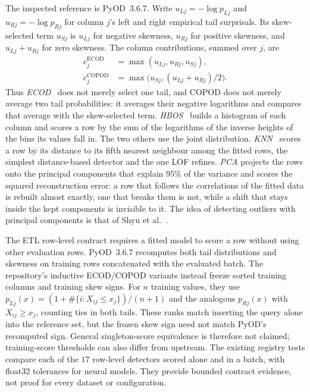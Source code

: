 \documentclass[conference]{IEEEtran}
\begin{document}
The inspected reference is PyOD~3.6.7. Write $u_{Lj}=-\log p_{Lj}$ and
$u_{Rj}=-\log p_{Rj}$ for column $j$'s left and right empirical tail
surprisals. Its skew-selected term $u_{Sj}$ is $u_{Lj}$ for negative
skewness, $u_{Rj}$ for positive skewness, and $u_{Lj}+u_{Rj}$ for zero
skewness. The column contributions, summed over $j$, are
\[
\begin{aligned}
c_j^{\mathrm{ECOD}}&=\max(u_{Lj},u_{Rj},u_{Sj}),\\
c_j^{\mathrm{COPOD}}&=\max\bigl(u_{Sj},(u_{Lj}+u_{Rj})/2\bigr).
\end{aligned}
\]
Thus \emph{ECOD}~\cite{li2023ecod} does not merely select one tail, and
COPOD does not merely average two tail probabilities: it averages their
negative logarithms and compares that average with the skew-selected term.
\emph{HBOS}~\cite{goldstein2012hbos} builds a histogram of each column and
scores a row by the sum of the logarithms of the inverse heights of the
bins its values fall in. The two others use the joint distribution.
\emph{KNN}~\cite{ramaswamy2000efficient} scores a row by its distance to
its fifth nearest neighbour among the fitted rows, the simplest
distance-based detector and the one LOF refines. \emph{PCA}
projects the rows onto the principal components that explain $95\%$ of
the variance and scores the squared reconstruction error: a row that
follows the correlations of the fitted data is rebuilt almost exactly,
one that breaks them is not, while a shift that stays inside the kept
components is invisible to it. The idea of detecting outliers with
principal components is that of Shyu et al.~\cite{shyu2006principal}.

The ETL row-level contract requires a fitted model to score a row without
using other evaluation rows. PyOD~3.6.7 recomputes both tail distributions
and skewness on training rows concatenated with the evaluated batch.
The repository's inductive ECOD/COPOD variants instead freeze sorted training
columns and training skew signs. For $n$ training values, they use
$p_{Lj}(x)=(1+\#\{i:X_{ij}\leq x_j\})/(n+1)$ and the analogous
$p_{Rj}(x)$ with $X_{ij}\geq x_j$, counting ties in both tails.
These ranks match inserting the query alone into the reference set, but
the frozen skew sign need not match PyOD's recomputed sign. General
singleton-score equivalence is therefore not claimed; training-score
thresholds can also differ from upstream. The existing registry tests
compare each of the $17$ row-level detectors scored alone and in a batch,
with float32 tolerances for neural models. They provide bounded contract
evidence, not proof for every dataset or configuration.
\end{document}
